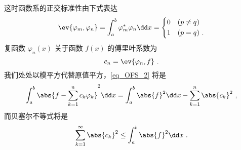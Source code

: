 这时函数系的正交标准性由下式表达
\begin{equation}
\ev{\varphi_m,\varphi_n}=\int_a^b\varphi_m^*\varphi_n\dd x=\left\{
\begin{aligned}
&0 \quad (p\neq q)\\
&1 \quad (p=q)~.
\end{aligned}\right.
\end{equation}
复函数 $\varphi_n(x)$ 关于函数 $f(x)$ 的傅里叶系数为
\begin{equation}
c_n=\ev{\varphi_n,f}~.
\end{equation}
我们处处以模平方代替原值平方，\autoref{eq_OFS_2} 将是
\begin{equation}
\int_a^b\abs{f-\sum_{k=1}^nc_k\varphi_k}^2\dd x=\int_a^b\abs{f}^2\dd x-\sum_{k=1}^n\abs{c_k}^2~,
\end{equation}
 而贝塞尔不等式将是
 \begin{equation}
 \sum_{k=1}^\infty\abs{c_k}^2\leq\int_a^b\abs{f}^2\dd x~.
 \end{equation}
 
